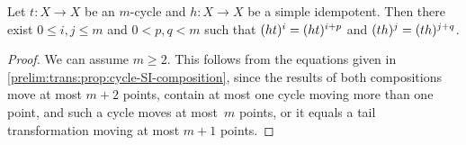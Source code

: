 \begin{corollary} \label{constrsync:prop:concat_cycle_SI}	
	Let $t \colon X \to X$ be an $m$-cycle
	and $h \colon X \to X$ be a simple idempotent.
	Then there exist $0 \le i,j \le m$
	and $0 < p,q < m$
	such that $( \concat{t}{h} )^i = ( \concat{t}{h} )^{i + p}$
	and $( \concat{h}{t} )^j = ( \concat{h}{t} )^{j+q}$.
\end{corollary}
\begin{proof}
	We can assume $m \ge 2$.
	This follows from the equations given in \cref{prelim:trans:prop:cycle-SI-composition}, since
	the results of both compositions move at most $m + 2$ points,
	contain at most one cycle moving more than one point, and such a cycle moves at most~$m$
	points, or it equals a tail transformation moving at most $m + 1$ 	points.	
\end{proof}